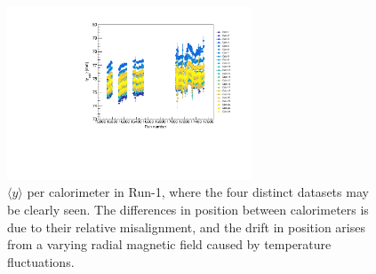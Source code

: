 \begin{figure}[t!]
\centering{}
\includegraphics[trim={0 0 0 0},clip,width=0.65\textwidth]{Images/Chapter4/PerCaloYvsRun_Run1_15921_17527.pdf}
\caption{$\langle y \rangle$ per calorimeter in Run-1, where the four distinct datasets may be clearly seen. The differences in position between calorimeters is due to their relative misalignment, and the drift in position arises from a varying radial magnetic field caused by temperature fluctuations.}
\label{fig:PerCaloYvsRun_Run1}
\end{figure}  

